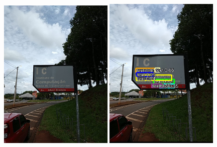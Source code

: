 \begin{figure}[h!]
\centering
\includegraphics[width=0.49\textwidth]{Mobile/images/app24.jpg}
\includegraphics[width=0.49\textwidth]{Mobile/images/app25.jpg}

\vspace{1.5mm}


\end{figure}
